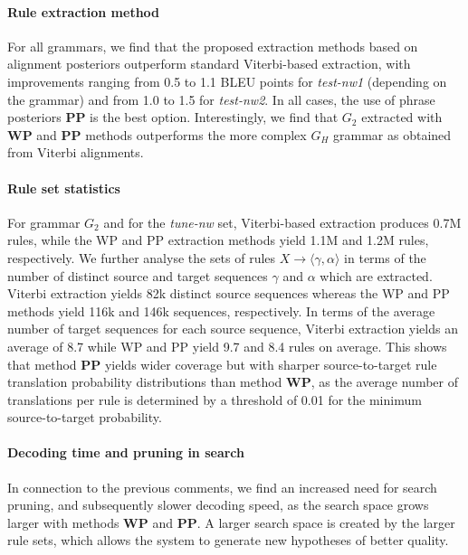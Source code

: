 \paragraph{Rule extraction method}

For all grammars, we find that the proposed
extraction methods based on alignment posteriors outperform standard
Viterbi-based extraction, with improvements ranging from 0.5 to 1.1 BLEU points
for {\em test-nw1} (depending on the grammar) and from 1.0 to 1.5 for
{\em test-nw2}. In all cases, the use of phrase posteriors {\bf PP} is the best
option. Interestingly, we find that $G_2$ extracted with {\bf WP} and {\bf PP}
methods outperforms the more complex $G_H$ grammar as obtained from Viterbi
alignments.
    
\paragraph{Rule set statistics}

For grammar $G_2$ and for the {\em tune-nw} set,
Viterbi-based extraction produces 0.7M rules, while the WP and PP extraction
methods yield 1.1M and 1.2M rules, respectively. We further analyse the sets of
rules $X \rightarrow \langle \gamma,\alpha \rangle$ in terms of the number of
distinct source and target sequences $\gamma$ and $\alpha$ which are extracted.
Viterbi extraction yields 82k distinct source sequences whereas the WP and PP
methods yield 116k and 146k sequences, respectively. In terms of the average
number of target sequences for each source sequence, Viterbi extraction yields
an average of 8.7 while WP and PP yield 9.7 and 8.4 rules on average. This shows
that method {\bf PP} yields wider coverage but with sharper source-to-target
rule translation probability distributions than method {\bf WP}, as the average
number of translations per rule is determined by a threshold of 0.01 for
the minimum source-to-target probability. %

\paragraph{Decoding time and pruning in search}

In connection to the previous
comments, we find an increased need for search pruning, and subsequently slower
decoding speed, as the search space grows larger with methods {\bf WP} and
{\bf PP}. A larger search space is created by the larger rule sets, which allows
the system to generate new hypotheses of better quality.

